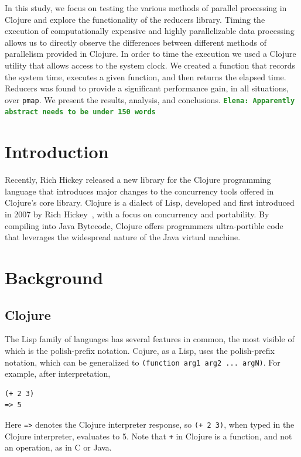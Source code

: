 \documentclass[12pt]{article}
\newcommand{\comment}[1]{{\bf \tt  {#1}}}
\newcommand{\emcomment}[1]{\textcolor{ForestGreen}{\comment{Elena: {#1}}}}
\newcommand{\clocode}[1]{{\texttt {#1}}}
\begin{document}
In this study, we focus on testing the various methods of parallel processing in Clojure and explore the functionality of the reducers library. Timing the execution of computationally expensive and highly parallelizable data processing allows us to directly observe the differences between different methods of parallelism provided in Clojure. In order to time the execution we used a Clojure utility that allows access to the system clock. We created a function that records the system time, executes a given function, and then returns the elapsed time.
Reducers was found to provide a significant performance gain, in all situations, over \clocode{pmap}.  We present the results, analysis, and conclusions.
\emcomment{Apparently abstract needs to be under 150 words}


 \newpage

\setcounter{page}{1}


\section{Introduction}\label{sec:intro}

	Recently, Rich Hickey released a new library for the Clojure programming language that introduces major changes to the concurrency tools offered in Clojure's core library. Clojure is a dialect of Lisp, developed and first introduced in 2007 by Rich Hickey~\cite{Hickey:2008}, with a focus on concurrency and portability. By compiling into Java Bytecode, Clojure offers programmers ultra-portible code that leverages the widespread nature of the Java virtual machine. 

\section{Background}\label{sec:background}

\subsection{Clojure}\label{sec:clojure}
The Lisp family of languages has several features in common, the most visible of which is the polish-prefix notation. Cojure, as a Lisp, uses the polish-prefix notation, which can be generalized to \clocode{(function arg1 arg2 ... argN)}. For example, after interpretation, 
\begin{verbatim}
(+ 2 3)
=> 5
\end{verbatim}
Here \clocode{=>} denotes the Clojure interpreter response, so \clocode{(+ 2 3)}, when typed in the Clojure interpreter, evaluates to 5. 
Note that \clocode{+} in Clojure is a function, and not an operation, as in C or Java. 
\end{document}
